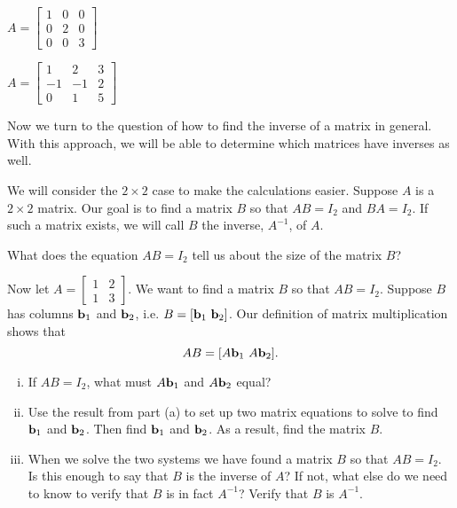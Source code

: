 \begin{pa}
\begin{minipage}{2.0in}
\item $A = \left[ \begin{array}{rrc} 1&0&0 \\ 0&2&0\\0&0&3 \end{array} \right]$
\end{minipage}
\begin{minipage}{2.0in}
\item $A = \left[ \begin{array}{rrc} 1&2&3 \\ -1&-1&2\\0&1&5 \end{array} \right]$
\end{minipage}

\ea

\item Now we turn to the question of how to find the inverse of a matrix in general. With this approach, we will be able to determine which matrices have inverses as well. 

We will consider the $2 \times 2$ case to make the calculations easier. Suppose $A$ is a $2 \times 2$ matrix. Our goal is to find a matrix $B$ so that $AB = I_2$ and $BA = I_2$. If such a matrix exists, we will call $B$ the inverse, $A^{-1}$, of $A$. 
	\ba
	\item What does the equation $AB = I_2$ tell us about the size of the matrix $B$?
		

	\item Now let $A = \left[ \begin{array}{cc} 1&2 \\ 1&3 \end{array} \right]$. We want to find a  matrix $B$ so that $AB = I_2$. Suppose $B$ has columns $\mathbf{b}_1$ and $\mathbf{b}_2$, i.e. $B = [\mathbf{b}_1 \ \mathbf{b}_2]$. Our definition of matrix multiplication shows that 
	\[AB = [A\mathbf{b}_1 \ A\mathbf{b}_2].\]
		\begin{enumerate}[i.]
		\item If $AB = I_2$, what must $A\mathbf{b}_1$ and $A \mathbf{b}_2$ equal? 
		
		\item Use the result from part (a) to set up two matrix equations to solve to find $\mathbf{b}_1$ and $\mathbf{b}_2$. Then find $\mathbf{b}_1$ and $\mathbf{b}_2$. As a result, find the matrix $B$.

		\item When we solve the two systems we have found a matrix $B$ so that $AB = I_2$. Is this enough to say that $B$ is the inverse of $A$? If not, what else do we need to know to verify that $B$ is in fact $A^{-1}$? Verify that $B$ is $A^{-1}$. 
	

\end{enumerate}
\end{pa}
